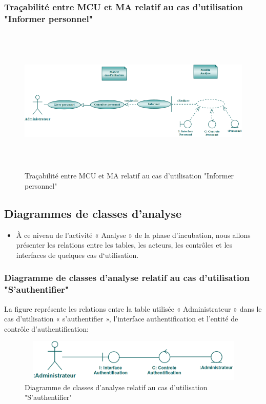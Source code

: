 \documentclass[12 pt ]{report}
\begin{document}
\subsubsection{Traçabilité entre MCU et MA relatif au cas d’utilisation "Informer personnel" }
\begin{figure}[h]
\begin{center}
\includegraphics[width= 14cm , height =7cm]{tra_info_per.png}
\caption{Traçabilité entre MCU et MA relatif au cas d’utilisation "Informer personnel"}
\end{center}
\end{figure}
\newpage
\subsection{Diagrammes de classes d'analyse}
\begin{itemize}[font=\color{black} \Large, label=] 
\item À ce niveau de l’activité « Analyse » de la phase d’incubation, nous allons présenter les relations entre les tables, les acteurs, les contrôles et les interfaces de quelques cas d‘utilisation.
\end{itemize}
\subsubsection{Diagramme de classes d’analyse relatif au cas d’utilisation "S’authentifier" }
La figure  représente les relations entre la table utilisée « Administrateur » dans le cas d’utilisation « s'authentifier », l’interface  authentification et  l'entité de  contrôle d'authentification:
\begin{figure}[h]
\begin{center}
\includegraphics[width= 12cm , height =2cm]{classid.png}
\caption{Diagramme de classes d’analyse relatif au cas d’utilisation "S’authentifier"}
\end{center}
\end{figure}
\end{document}
